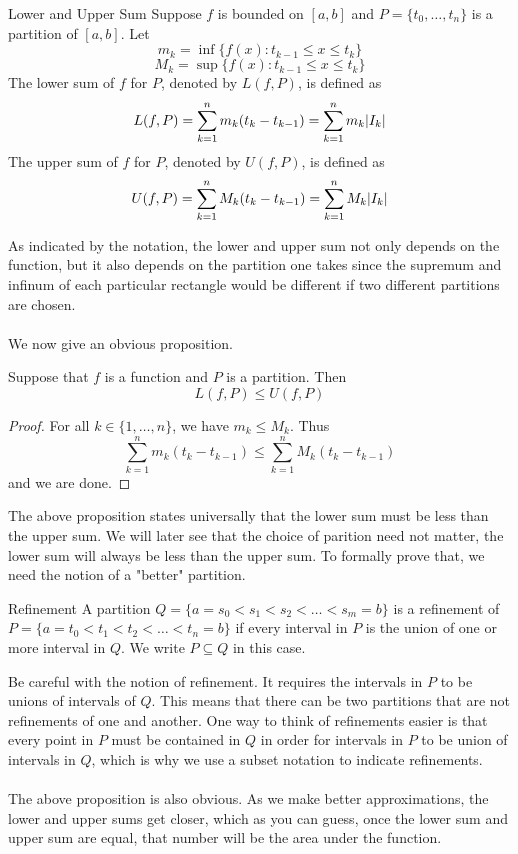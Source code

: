 \documentclass[a4paper]{article}
\begin{document}
\begin{defn}{Lower and Upper Sum}{} Suppose $f$ is bounded on $[a,b]$ and $P=\{t_0,\dots,t_n\}$ is a partition of $[a,b]$. Let $$m_k=\inf\{f(x):t_{k-1}\leq x\leq t_k\}$$ $$M_k=\sup\{f(x):t_{k-1}\leq x\leq t_k\}$$ The lower sum of $f$ for $P$, denoted by $L(f,P)$, is defined as $$L(f,P)=\sum_{k=1}^nm_k(t_k-t_{k-1})=\sum_{k=1}^nm_k\abs{I_k}$$ The upper sum of $f$ for $P$, denoted by $U(f,P)$, is defined as $$U(f,P)=\sum_{k=1}^nM_k(t_k-t_{k-1})=\sum_{k=1}^nM_k\abs{I_k}$$
\end{defn}

As indicated by the notation, the lower and upper sum not only depends on the function, but it also depends on the partition one takes since the supremum and infinum of each particular rectangle would be different if two different partitions are chosen. \\~\\
We now give an obvious proposition. 

\begin{prp}{}{} Suppose that $f$ is a function and $P$ is a partition. Then $$L(f,P)\leq U(f,P)$$ \tcbline
\begin{proof} For all $k\in\{1,\dots,n\}$, we have $m_k\leq M_k$. Thus $$\sum_{k=1}^nm_k(t_k-t_{k-1})\leq\sum_{k=1}^nM_k(t_k-t_{k-1})$$ and we are done. 
\end{proof}
\end{prp}

The above proposition states universally that the lower sum must be less than the upper sum. We will later see that the choice of parition need not matter, the lower sum will always be less than the upper sum. To formally prove that, we need the notion of a "better" partition. 

\begin{defn}{Refinement}{} A partition $Q=\{a=s_0<s_1<s_2<\dots<s_m=b\}$ is a refinement of $P=\{a=t_0<t_1<t_2<\dots<t_n=b\}$ if every interval in $P$ is the union of one or more interval in $Q$. We write $P\subseteq Q$ in this case. 
\end{defn}

Be careful with the notion of refinement. It requires the intervals in $P$ to be unions of intervals of $Q$. This means that there can be two partitions that are not refinements of one and another. One way to think of refinements easier is that every point in $P$ must be contained in $Q$ in order for intervals in $P$ to be union of intervals in $Q$, which is why we use a subset notation to indicate refinements. \\~\\
The above proposition is also obvious. As we make better approximations, the lower and upper sums get closer, which as you can guess, once the lower sum and upper sum are equal, that number will be the area under the function. 
\end{document}
